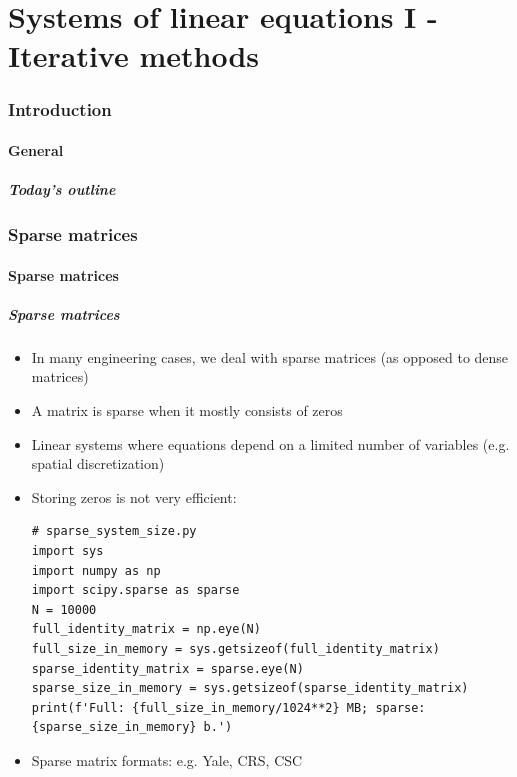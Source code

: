\part{Systems of linear equations I - Iterative methods}
\section{Introduction}
\subsection*{General}
\begin{frame}[label=contents_lin3]
  \frametitle{Today's outline}
\end{frame}

\section{Sparse matrices}
\subsection*{Sparse matrices}

\begin{frame}[fragile]
  \frametitle{Sparse matrices}
  \begin{itemize}
    \item In many engineering cases, we deal with sparse matrices (as opposed to dense matrices)
    \item A matrix is sparse when it mostly consists of zeros
    \item Linear systems where equations depend on a limited number of variables (e.g. spatial discretization)
    \item Storing zeros is not very efficient:
    \begin{lstlisting}
# sparse_system_size.py
import sys
import numpy as np
import scipy.sparse as sparse
N = 10000
full_identity_matrix = np.eye(N)
full_size_in_memory = sys.getsizeof(full_identity_matrix)
sparse_identity_matrix = sparse.eye(N)
sparse_size_in_memory = sys.getsizeof(sparse_identity_matrix)
print(f'Full: {full_size_in_memory/1024**2} MB; sparse: {sparse_size_in_memory} b.')
    \end{lstlisting}
    \item Sparse matrix formats: e.g. Yale, CRS, CSC
\end{itemize}
\end{frame}

